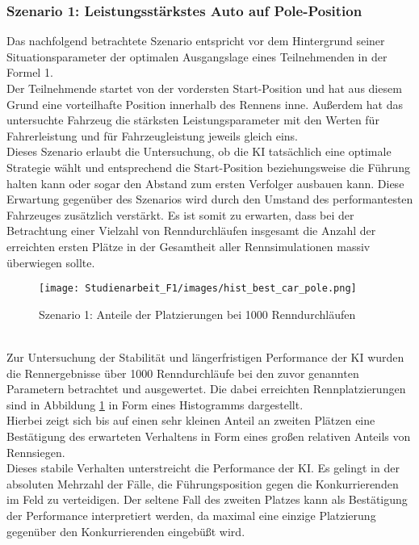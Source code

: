 \subsubsection{Szenario 1: Leistungsstärkstes Auto auf Pole-Position}\label{sec:best_car_pole}
Das nachfolgend betrachtete Szenario entspricht vor dem Hintergrund seiner Situationsparameter der optimalen Ausgangslage eines Teilnehmenden in der Formel 1.\\
Der Teilnehmende startet von der vordersten Start-Position und hat aus diesem Grund eine vorteilhafte Position innerhalb des Rennens inne. Außerdem hat das untersuchte Fahrzeug die stärksten Leistungsparameter mit den Werten für Fahrerleistung und für Fahrzeugleistung jeweils gleich eins.\\
Dieses Szenario erlaubt die Untersuchung, ob die KI tatsächlich eine optimale Strategie wählt und entsprechend die Start-Position beziehungsweise die Führung halten kann oder sogar den Abstand zum ersten Verfolger ausbauen kann. Diese Erwartung gegenüber des Szenarios wird durch den Umstand des performantesten Fahrzeuges zusätzlich verstärkt. Es ist somit zu erwarten, dass bei der Betrachtung einer Vielzahl von Renndurchläufen insgesamt die Anzahl der erreichten ersten Plätze in der Gesamtheit aller Rennsimulationen massiv überwiegen sollte.
\\
\begin{figure}
    \centering
    \texttt{[image: Studienarbeit\_F1/images/hist\_best\_car\_pole.png]}
    \caption{Szenario 1: Anteile der Platzierungen bei 1000 Renndurchläufen}
    \label{fig:hist_best_car_pole}
\end{figure}
\\
Zur Untersuchung der Stabilität und längerfristigen Performance der KI wurden die Rennergebnisse über 1000 Renndurchläufe bei den zuvor genannten Parametern betrachtet und ausgewertet. Die dabei erreichten Rennplatzierungen sind in Abbildung \ref{fig:hist_best_car_pole} in Form eines Histogramms dargestellt.\\
Hierbei zeigt sich bis auf einen sehr kleinen Anteil an zweiten Plätzen eine Bestätigung des erwarteten Verhaltens in Form eines großen relativen Anteils von Rennsiegen.\\
Dieses stabile Verhalten unterstreicht die Performance der KI. Es gelingt in der absoluten Mehrzahl der Fälle, die Führungsposition gegen die Konkurrierenden im Feld zu verteidigen. Der seltene Fall des zweiten Platzes kann als Bestätigung der Performance interpretiert werden, da maximal eine einzige Platzierung gegenüber den Konkurrierenden eingebüßt wird.
